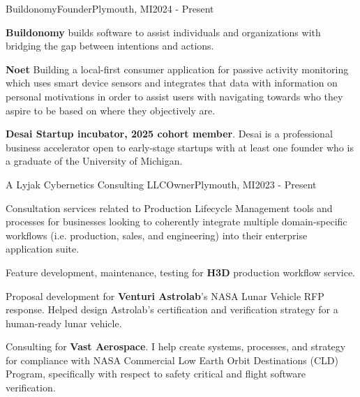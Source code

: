 



\begin{cventries}


  \cventry
  {Buildonomy}{Founder}{Plymouth, MI}{2024 - Present}
  {
    \begin{cvitems}
    \item \textbf{Buildonomy} builds software to assist individuals and organizations with bridging
      the gap between intentions and actions.
    \item \textbf{Noet} Building a local-first consumer application for passive activity monitoring
      which uses smart device sensors and integrates that data with information on personal
      motivations in order to assist users with navigating towards who they aspire to be based on
      where they objectively are.
    \item \textbf{Desai Startup incubator, 2025 cohort member}. Desai is a professional business
      accelerator open to early-stage startups with at least one founder who is a graduate of the
      University of Michigan.
    \end{cvitems}
  }

  \cventry
  {A Lyjak Cybernetics Consulting LLC}{Owner}{Plymouth, MI}{2023 - Present}
  {
    \begin{cvitems}
    \item Consultation services related to Production Lifecycle Management tools and processes for
      businesses looking to coherently integrate multiple domain-specific workflows
      (i.e. production, sales, and engineering) into their enterprise application suite.
    \item Feature development, maintenance, testing for \textbf{H3D} production workflow service.
    \item Proposal development for \textbf{Venturi Astrolab}'s NASA Lunar Vehicle RFP
      response. Helped design Astrolab's certification and verification strategy for a human-ready
      lunar vehicle.
    \item Consulting for \textbf{Vast Aerospace}. I help create systems, processes, and strategy for
      compliance with NASA Commercial Low Earth Orbit Destinations (CLD) Program, specifically with
      respect to safety critical and flight software verification.
    \end{cvitems}
  }


\end{cventries}
